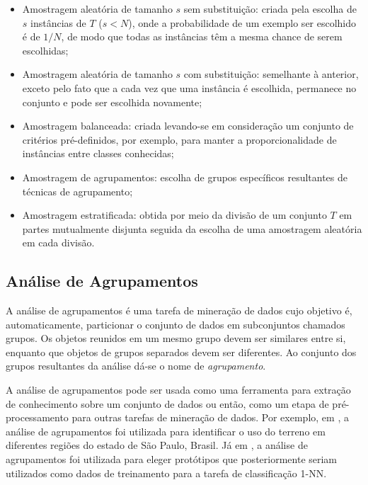 \begin{itemize}
    \item Amostragem aleatória de tamanho $s$ sem substituição: criada pela
		escolha de $s$ instâncias de $T$ ($s < N$), onde a probabilidade de um
		exemplo ser escolhido é de $1/N$, de modo que todas as instâncias têm a
		mesma chance de serem escolhidas;
    
    \item Amostragem aleatória de tamanho $s$ com substituição: semelhante à
		anterior, exceto pelo fato que a cada vez que uma instância é escolhida,
		permanece no conjunto e pode ser escolhida novamente;
    
    \item Amostragem balanceada: criada levando-se em consideração um conjunto
		de critérios pré-definidos, por exemplo, para manter a proporcionalidade
		de instâncias entre classes conhecidas;
    
    \item Amostragem de agrupamentos: escolha de grupos específicos resultantes
		de técnicas de agrupamento;
    
    \item Amostragem estratificada: obtida por meio da divisão de um conjunto
		$T$ em partes mutualmente disjunta seguida da escolha de uma amostragem
		aleatória em cada divisão.
\end{itemize}




\subsection{Análise de Agrupamentos}
	\label{subsec:analise_agrupamentos}
	
A análise de agrupamentos é uma tarefa de mineração de dados cujo objetivo é,
automaticamente, particionar o conjunto de dados em subconjuntos chamados
grupos. Os objetos reunidos em um mesmo grupo devem ser similares entre si,
enquanto que objetos de grupos separados devem ser diferentes. Ao conjunto dos
grupos resultantes da análise dá-se o nome de \emph{agrupamento}.

A análise de agrupamentos pode ser usada como uma ferramenta para extração de
conhecimento sobre um conjunto de dados ou então, como um etapa de
pré-processamento para outras tarefas de mineração de dados. Por exemplo, em
\cite{gonccalves2014land}, a análise de agrupamentos foi utilizada para
identificar o uso do terreno em diferentes regiões do estado de São Paulo,
Brasil. Já em \cite{petitjean2014dynamic}, a análise de agrupamentos foi
utilizada para eleger protótipos que posteriormente seriam utilizados como dados
de treinamento para a tarefa de classificação 1-NN.

